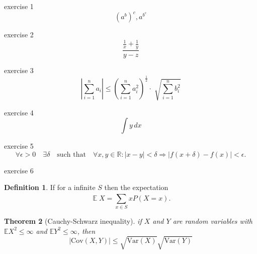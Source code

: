 \documentclass[a4paper]{article}
\theoremstyle{plain}
\newtheorem{theorem}{Theorem}
\theoremstyle{definition}
\newtheorem{definition}[theorem]{Definition}
\DeclareMathOperator*{\expectation}{\mathbb{E}}
\newcommand*{\nf}[1]{\mathrm{#1}}
\newcommand*{\field}[1]{\mathbb{#1}}
\begin{document}
exercise 1
\begin{equation}
    (a^b)^c, a^{b^c}
\end{equation}

exercise 2
\begin{equation}
    \frac{\frac{1}{x} + \frac{1}{y}}{y - z}
\end{equation}

exercise 3
\begin{equation}
    \left|\sum_{i=1}^{n}a_i\right| \le \left(\sum_{i=1}^{n}a_i^2\right)^{\frac{1}{2}} \cdot \sqrt[]{\sum_{i=1}^{n}b_i^2}
\end{equation}

exercise 4
\begin{equation}
    \int y\, dx
\end{equation}

exercise 5
\[
    \forall \epsilon > 0 \quad \exists \delta \quad \text{such that} \quad \forall x,y \in \mathbb{R}: \left|x-y\right|<\delta \Rightarrow \left|f(x+\delta)-f(x)\right| < \epsilon.
\]

exercise 6
\begin{definition}
    If for a infinite $S$ then the expectation
    \[\expectation X = \sum_{x \in S}^{} xP(X = x).\]
\end{definition}

\begin{theorem}[Cauchy-Schwarz inequality]
    if $X$ and $Y$ are random variables with $\field{E}X^2 \le \infty$ and $\field{E}Y^2 \le \infty$, then
    \[|\nf{Cov}(X,Y)| \le \sqrt{\mathrm{Var}(X)} \sqrt{\mathrm{Var}(Y)}\]
\end{theorem}
\end{document}
